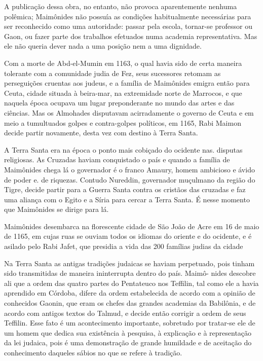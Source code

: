 \begin{itemize}
\begin{enumrate}
A publicação dessa obra, no entanto, não provoca aparentemente nenhuma
polêmica; Maimônides não possuía as condições habitualmente ne­cessárias
para ser reconhecido como uma autoridade: passar pela escola, tornar-se
professor ou Gaon, ou fazer parte dos trabalhos efetuados numa academia
re­presentativa. Mas ele não queria dever nada a uma posição nem a uma
dignidade.

Com a morte de Abd-el-Mumin em 1163, o qual havia sido de certa maneira
tolerante com a comunidade judia de Fez, seus sucessores retomam as
perseguições cruentas aos judeus, e a família de Maimônides emigra então
para Ceuta, cidade situada à beira-mar, na extremidade norte de
Marrocos, e que naquela época ocupava um lugar preponderante no mundo
das artes e das ciências. Mas os Almohades disputavam acirradamente o
governo de Ceuta e em meio a tumultuados golpes e contra-golpes
políticos, em 1165, Rabi Mai­mon decide partir novamente, desta vez com
destino à Terra Santa.

A Terra Santa era na época o ponto mais cobiçado do ocidente nas.
disputas religiosas. As Cruzadas haviam conquistado o país e quando a
família de Maimônides chega lá o governador é o franco Amaury, homem
ambicioso e ávido de poder e. de riquezas. Contudo Nureddin, governador
muçulmano da região do Tigre, decide partir para a Guerra Santa contra
os cristãos das cru­zadas e faz uma aliança com o Egito e a Síria para
cercar a Terra Santa. É nesse momento que Maimônides se dirige para lá.

Maimônides desembarca na florescente cidade de São João de Acre em 16 de
maio de 1165, em cujas ruas se ouviam todos os idiomas do oriente e do
ocidente, e é asilado pelo Rabi Jafet, que presidia a vida das 200
famílias judias da cidade

Na Terra Santa as antigas tradições judaicas se haviam perpetuado, pois
tinham sido transmitidas de maneira ininterrupta dentro do país. Maimô-
nides descobre ali que a ordem das quatro partes do Pentateuco nos
Teffilin, tal como ele a havia aprendido em Córdoba, difere da ordem
estabelecida de acordo com a opinião de conhecidos Gaonin, que eram os
chefes das grandes academias da Babilônia, e de acordo com antigos
textos do Talmud, e decide então corrigir a ordem de seus Teffilin. Esse
fato é um acontecimento impor­tante, sobretudo por tratar-se ele de um
homem que dedica sua existência à pesquisa, à explicação e à
representação da lei judaica, pois é uma demonstra­ção de grande
humildade e de aceitação do conhecimento daqueles sábios no que se
refere à tradição.


\end{enumrate}
\end{itemize}
